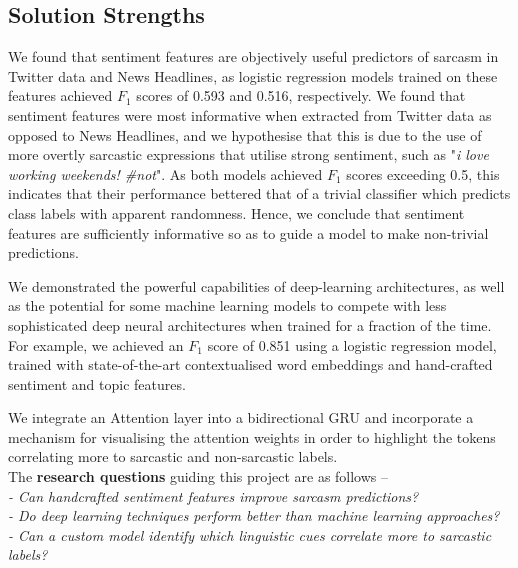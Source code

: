 \documentclass[12pt,a4paper]{article}
\begin{document}
\subsection{Solution Strengths}\vspace{-10pt}
\noindent We found that sentiment features are objectively useful predictors of sarcasm in Twitter data and News Headlines, as logistic regression models trained on these features achieved $F_1$ scores of 0.593 and 0.516, respectively. We found that sentiment features were most informative when extracted from Twitter data as opposed to News Headlines, and we hypothesise that this is due to the use of more overtly sarcastic expressions that utilise strong sentiment, such as "\textit{i love working weekends! \#not}". As both models achieved $F_1$ scores exceeding 0.5, this indicates that their performance bettered that of a trivial classifier which predicts class labels with apparent randomness. Hence, we conclude that sentiment features are sufficiently informative so as to guide a model to make non-trivial predictions.

We demonstrated the powerful capabilities of deep-learning architectures, as well as the potential for some machine learning models to compete with less sophisticated deep neural architectures when trained for a fraction of the time. For example, we achieved an $F_1$ score of 0.851 using a logistic regression model, trained with state-of-the-art contextualised word embeddings and hand-crafted sentiment and topic features.

We integrate an Attention layer into a bidirectional GRU and incorporate a mechanism for visualising the attention weights in order to highlight the tokens correlating more to sarcastic and non-sarcastic labels.\\


\noindent The \textbf{research questions} guiding this project are as follows --\\
\indent \textit{- Can handcrafted sentiment features improve sarcasm predictions?}\\ 
\indent \textit{- Do deep learning techniques perform better than machine learning approaches?}\\ 
\indent \textit{- Can a custom model identify which linguistic cues correlate more to sarcastic labels?}\\
\end{document}
